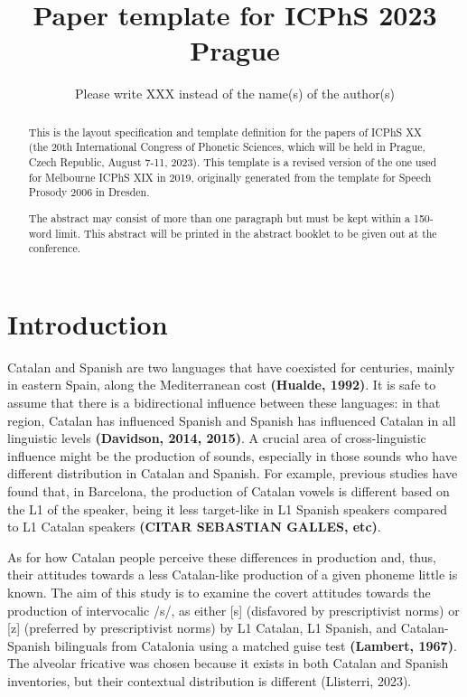 \documentclass[
  a4paper,
  11pt,
  twocolumn]{article}
\author{}
\date{\vspace{-2.5em}}
\begin{document}
\title{Paper template for {ICPhS} 2023 Prague}
\author{Please write XXX instead of the name(s) of the author(s)}


\maketitle

\begin{abstract}
This is the layout specification and template definition for the papers of ICPhS XX (the 20th International Congress of Phonetic Sciences, which will be held in Prague, Czech Republic, August 7-11, 2023). 
This template is a revised version of the one used for Melbourne ICPhS XIX in 2019, originally generated from the template for Speech Prosody 2006 in Dresden.

The abstract may consist of more than one paragraph but must be kept within a 150-word limit. 
This abstract will be printed in the abstract booklet to be given out at the conference.
\end{abstract}



\section{Introduction}

Catalan and Spanish are two languages that have coexisted for centuries,
mainly in eastern Spain, along the Mediterranean cost \textbf{(Hualde,
1992)}. It is safe to assume that there is a bidirectional influence
between these languages: in that region, Catalan has influenced Spanish
and Spanish has influenced Catalan in all linguistic levels
\textbf{(Davidson, 2014, 2015)}. A crucial area of cross-linguistic
influence might be the production of sounds, especially in those sounds
who have different distribution in Catalan and Spanish. For example,
previous studies have found that, in Barcelona, the production of
Catalan vowels is different based on the L1 of the speaker, being it
less target-like in L1 Spanish speakers compared to L1 Catalan speakers
\textbf{(CITAR SEBASTIAN GALLES, etc)}.

As for how Catalan people perceive these differences in production and,
thus, their attitudes towards a less Catalan-like production of a given
phoneme little is known. The aim of this study is to examine the covert
attitudes towards the production of intervocalic /s/, as either {[}s{]}
(disfavored by prescriptivist norms) or {[}z{]} (preferred by
prescriptivist norms) by L1 Catalan, L1 Spanish, and Catalan-Spanish
bilinguals from Catalonia using a matched guise test \textbf{(Lambert,
1967)}. The alveolar fricative was chosen because it exists in both
Catalan and Spanish inventories, but their contextual distribution is
different (Llisterri, 2023).
\end{document}
